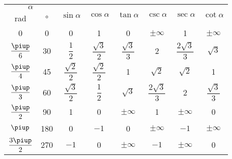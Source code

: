 \begin{center}
    \label{taula:func-trig-angles}
   \begin{tabular}{cccccccc}
   \toprule[1pt]
    \multicolumn{2}{c}{$\alpha$} &
    \multirow{2}{15mm}{\hspace{2ex}\rule{0mm}{6mm}$\sin\alpha$} &
    \multirow{2}{15mm}{\hspace{2ex}\rule{0mm}{6mm}$\cos\alpha$}  &
    \multirow{2}{15mm}{\hspace{2ex}\rule{0mm}{6mm}$\tan\alpha$} &
    \multirow{2}{15mm}{\hspace{2ex}\rule{0mm}{6mm}$\csc\alpha$} &
    \multirow{2}{15mm}{\hspace{2ex}\rule{0mm}{6mm}$\sec\alpha$}  &
    \multirow{2}{15mm}{\hspace{2ex}\rule{0mm}{6mm}$\cot\alpha$}\\
    \cmidrule(rl){1-2}
    rad & \unit{\degree} & & & & & & \\
   \midrule
   0 & 0 & 0 & 1 & 0 & $\pm\infty$ & 1 & $\pm\infty$\\[1ex]
   $\dfrac{\piup}{6}$ & 30 & $\dfrac{1}{2}$ & $\dfrac{\sqrt{3}}{2}$ &
   $\dfrac{\sqrt{3}}{3}$ & 2 & $\dfrac{2\sqrt{3}}{3}$ & $\sqrt{3}$\\[1.5ex]
   $\dfrac{\piup}{4}$ & 45 & $\dfrac{\sqrt{2}}{2}$  &
   $\dfrac{\sqrt{2}}{2}$ & 1 & $\sqrt{2}$ & $\sqrt{2}$ & 1\\[1.5ex]
   $\dfrac{\piup}{3}$ & 60 &  $\dfrac{\sqrt{3}}{2}$ & $\dfrac{1}{2}$ &
   $\sqrt{3}$ & $\dfrac{2\sqrt{3}}{3}$ & 2 & $\dfrac{\sqrt{3}}{3}$\\[2ex]
   $\dfrac{\piup}{2}$ & 90 & 1 & 0 & $\pm\infty$ & 1 & $\pm\infty$ & 0\\[1.5ex]
   $\piup$ & 180 & 0 & $-1$ & 0 & $\pm\infty$ & $-1$ & $\pm\infty$\\[1ex]
   $\dfrac{3\piup}{2}$ & 270 & $-1$ & 0 & $\pm\infty$ & $-1$ & $\pm\infty$ & 0\\
   \bottomrule[1pt]
   \end{tabular}
\end{center}

